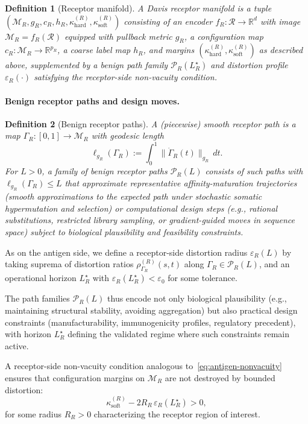 \documentclass[11pt]{article}
\newcommand{\Rcal}{\mathcal{R}}
\newcommand{\M}{\mathcal{M}}
\newcommand{\Pcal}{\mathcal{P}}
\newtheorem{definition}{Definition}
\begin{document}
\begin{definition}[Receptor manifold]
\label{def:receptor-manifold}
A \emph{Davis receptor manifold} is a tuple $(\M_R, g_R, c_R, h_R, \kappa^{(R)}_{\mathrm{hard}}, \kappa^{(R)}_{\mathrm{soft}})$ consisting of an encoder $f_R : \Rcal \to \mathbb{R}^d$ with image $\M_R = f_R(\Rcal)$ equipped with pullback metric $g_R$, a configuration map $c_R : \M_R \to \mathbb{R}^{p_R}$, a coarse label map $h_R$, and margins $(\kappa^{(R)}_{\mathrm{hard}}, \kappa^{(R)}_{\mathrm{soft}})$ as described above, supplemented by a benign path family $\Pcal_R(L_R^\star)$ and distortion profile $\varepsilon_R(\cdot)$ satisfying the receptor-side non-vacuity condition.
\end{definition}

\paragraph{Benign receptor paths and design moves.}
\begin{definition}[Benign receptor paths]
\label{def:benign-receptor-paths}
A (piecewise) smooth receptor path is a map $\Gamma_R : [0,1] \to \M_R$ with geodesic length
\[
  \ell_{g_R}(\Gamma_R) := \int_0^1 \bigl\|\dot{\Gamma}_R(t)\bigr\|_{g_R} \, dt.
\]
For $L > 0$, a family of \emph{benign receptor paths} $\Pcal_R(L)$ consists of such paths with $\ell_{g_R}(\Gamma_R) \le L$ that approximate representative affinity-maturation trajectories (smooth approximations to the expected path under stochastic somatic hypermutation and selection) or computational design steps (e.g., rational substitutions, restricted library sampling, or gradient-guided moves in sequence space) subject to biological plausibility and feasibility constraints.
\end{definition}

As on the antigen side, we define a receptor-side distortion radius $\varepsilon_R(L)$ by taking suprema of distortion ratios $\rho^{(R)}_{\Gamma_R}(s,t)$ along $\Gamma_R \in \Pcal_R(L)$, and an operational horizon $L_R^\star$ with $\varepsilon_R(L_R^\star) < \varepsilon_0$ for some tolerance.

The path families $\Pcal_R(L)$ thus encode not only biological plausibility (e.g., maintaining structural stability, avoiding aggregation) but also practical design constraints (manufacturability, immunogenicity profiles, regulatory precedent), with horizon $L_R^\star$ defining the validated regime where such constraints remain active.

A receptor-side non-vacuity condition analogous to~\eqref{eq:antigen-nonvacuity} ensures that configuration margins on $\M_R$ are not destroyed by bounded distortion:
\[
  \kappa^{(R)}_{\mathrm{soft}} - 2 R_R\,\varepsilon_R(L_R^\star) > 0,
\]
for some radius $R_R > 0$ characterizing the receptor region of interest.
\end{document}
